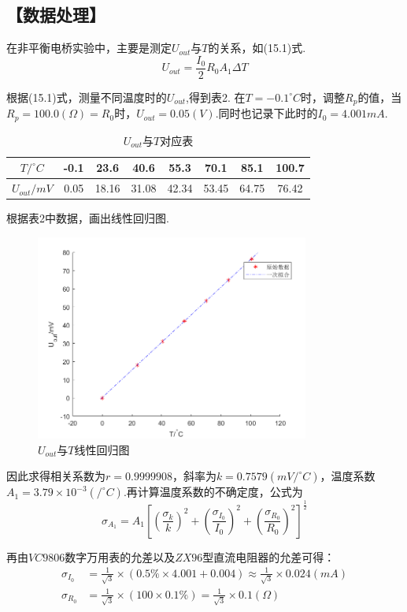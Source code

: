 \documentclass[12pt,a4paper,UTF8]{ctexart}
\begin{document}
\subsection*{【数据处理】}
在非平衡电桥实验中，主要是测定$U_{out}$与$T$的关系，如(15.1)式.
\begin{equation}
U_{out}=\frac{I_0}{2}R_0A_1\Delta T    \tag{15.1}
\end{equation}
\par
根据(15.1)式，测量不同温度时的$U_{out}$,得到表2.
\newpage
在$T=-0.1^{\circ}C$时，调整$R_p$的值，当$R_p=100.0(\Omega)=R_0$时，$U_{out}=0.05(V)$.同时也记录下此时的$I_0=4.001mA$.
\begin{table}[htbp]
\centering
\caption{$U_{out}$与$T$对应表}
\begin{tabular}{cccccccc}
\toprule
$T/^{\circ}C$&-0.1&23.6&40.6&55.3&70.1&85.1&100.7 \\
\hline
$U_{out}/mV$&0.05&18.16&31.08&42.34&53.45&64.75&76.42 \\
\bottomrule
\end{tabular}
\end{table}
\par
根据表2中数据，画出线性回归图.
\begin{figure}[htbp]
		\centering
		\includegraphics[width=9cm]{huigui.png}
		\caption{$U_{out}$与$T$线性回归图}
	\end{figure}
\par
因此求得相关系数为$r=0.9999908$，斜率为$k=0.7579(mV/^{\circ}C)$，温度系数$A_1=3.79\times10^{-3}(/^{\circ}C)$.再计算温度系数的不确定度，公式为
\begin{equation}
\sigma_{A_1}=A_1[(\frac{\sigma_k}{k})^2+(\frac{\sigma_{I_0}}{I_0})^2+(\frac{\sigma_{R_0}}{R_0})^2]^{\frac{1}{2}} \tag{15.2}
\end{equation}
\par
再由$VC9806$数字万用表的允差以及$ZX96$型直流电阻器的允差可得：
\begin{align*}
\sigma_{I_0}&=\frac{1}{\sqrt{3}}\times(0.5\%\times4.001+0.004)\approx \frac{1}{\sqrt{3}}\times0.024(mA) \\
\sigma_{R_0}&=\frac{1}{\sqrt{3}}\times(100\times0.1\%)=\frac{1}{\sqrt{3}}\times0.1(\Omega)
\end{align*}
\end{document}
